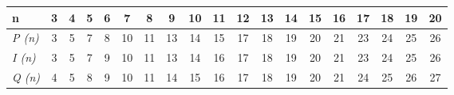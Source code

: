 
\begin{table}
\centering
\begin{tabular}{|p{1.5cm}|c|c|c|c|c|c|c|c|c|c|c|c|c|c|c|c|c|c|}
    \hline
    n & 3 & 4 & 5 & 6 & 7 & 8 & 9 & 10 & 11 & 12 & 13 & 14 & 15 & 16 & 17 & 18 & 19 & 20  \\
    \hline
    \textit{P (n)} & 3 & 5 & 7 & 8 & 10 & 11 & 13 & 14 & 15 & 17 & 18 & 19 & 20 & 21 & 23 & 24 & 25 & 26 \\
    \hline
    \textit{I (n)} & 3 & 5 & 7 & 9 & 10 & 11 & 13 & 14 & 16 & 17 & 18 & 19 & 20 & 21 & 23 & 24 & 25 & 26 \\
    \hline
    \textit{Q (n)} & 4 & 5 & 8 & 9 & 10 & 11 & 14 & 15 & 16 & 17 & 18 & 19 & 20 & 21 & 24 & 25 & 26 & 27 \\
    \hline
\end{tabular}
\end{table}

